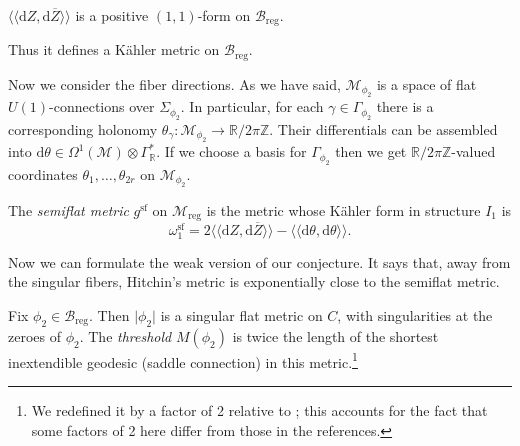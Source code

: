 \documentclass[12pt,letterpaper,reqno]{article}
\numberwithin{equation}{section}
\newcommand{\cB}{\ensuremath{\mathcal B}}
\newcommand{\cM}{\ensuremath{\mathcal M}}
\newcommand{\bbR}{\ensuremath{\mathbb R}}
\newcommand{\bbZ}{\ensuremath{\mathbb Z}}
\newcommand{\bbC}{\ensuremath{\mathbb C}}
\newcommand{\kahler}{K\"ahler\xspace}
\newcommand{\de}{\mathrm{d}}
\newcommand{\reg}{\mathrm{reg}}
\renewcommand{\sf}{\mathrm{sf}}
\newcommand{\gauge}{\mathrm{gauge}}
\newcommand{\abs}[1]{\lvert#1\rvert}
\newcommand{\IP}[1]{\langle#1\rangle}
\newcommand{\DIP}[1]{\langle\!\langle#1\rangle\!\rangle}
\newcommand{\ti}[1]{\textit{#1}}
\newcommand{\Sp}{\mathrm{Sp}}
\begin{document}
\begin{prop}[Positivity] 
$\DIP{\de Z, \de \overline{Z}}$ is a positive $(1,1)$-form on $\cB_\reg$. 
\end{prop}
Thus it defines
a \kahler metric on $\cB_\reg$.




Now we consider the fiber directions.
As we have said, $\cM_{\phi_2}$ is a space of flat $U(1)$-connections
over $\Sigma_{\phi_2}$. 
In particular, for each $\gamma \in \Gamma_{\phi_2}$ 
there is a corresponding
holonomy $\theta_\gamma: \cM_{\phi_2} \to \bbR / 2 \pi \bbZ$.
Their differentials can be assembled into
  $\de \theta \in \Omega^1(\cM) \otimes \Gamma^*_\bbR$.
If we choose a basis for $\Gamma_{\phi_2}$ 
then we get $\bbR / 2 \pi \bbZ$-valued coordinates $\theta_1, \dots, \theta_{2r}$
on $\cM_{\phi_2}$.

\begin{defn}
The \ti{semiflat metric}  $g^\sf$ on $\cM_\reg$ is the metric 
whose \kahler form in structure $I_1$ is
\begin{equation} \label{eq:omega1-sf}
  \omega^\sf_1 = 2 \DIP{\de Z, \de \overline{Z}} - \DIP{\de \theta, \de \theta}.
\end{equation}
\end{defn}                                   

Now we can formulate the weak version of our conjecture.
It says that, away from the singular fibers, Hitchin's
metric is exponentially close to the semiflat metric.

\begin{defn}[Threshold]
Fix $\phi_2 \in \cB_\reg$. Then $\abs{\phi_2}$ is a singular flat metric on $C$, with singularities at the
zeroes of $\phi_2$. The \ti{threshold} $M(\phi_2)$
is twice the length of the shortest inextendible geodesic
(saddle connection) in this metric.\footnote{We redefined it by a factor of 2 relative to \cite{dumas2019asymptotics}; this accounts for the fact
that some factors of 2 here differ from those in the references.}
\end{defn}
\end{document}
